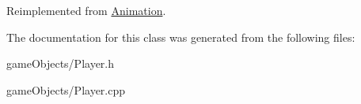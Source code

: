 Reimplemented from \hyperlink{class_animation_ae17ebf5f4b47801e460eb63342d858e8}{Animation}.



The documentation for this class was generated from the following files\+:\begin{DoxyCompactItemize}
\item 
game\+Objects/Player.\+h\item 
game\+Objects/Player.\+cpp\end{DoxyCompactItemize}
